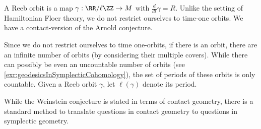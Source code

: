 





A Reeb orbit is a map $\gamma: \RR/\ell\ZZ\to M$ with $\frac{d}{dt}\gamma = R$. Unlike the setting of Hamiltonian Floer theory, we do not restrict ourselves to time-one orbits. We have a contact-version of the Arnold conjecture.

Since we do not restrict ourselves to time one-orbits, if there is an orbit, there are an infinite number of orbits (by considering their multiple covers). While there can possibly be even an uncountable number of orbits (see \cref{exr:geodesicsInSymplecticCohomology}), the set of periods of these orbits is only countable.  Given a Reeb orbit $\gamma$, let $\ell(\gamma)$ denote its period.


While the Weinstein conjecture is stated in terms of contact geometry, there is a standard method to translate questions in contact geometry to questions in symplectic geometry.





